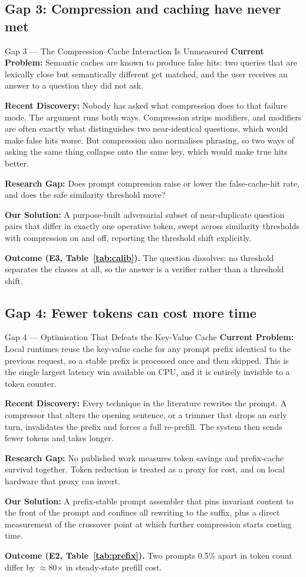\documentclass[11pt,a4paper]{article}
\newcommand{\lbl}[1]{\textcolor{accent}{\textbf{#1}}}
\begin{document}
\subsection{Gap 3: Compression and caching have never met}
\begin{gap}{Gap 3 --- The Compression--Cache Interaction Is Unmeasured}
\lbl{Current Problem:} Semantic caches are known to produce false hits: two
queries that are lexically close but semantically different get matched, and the
user receives an answer to a question they did not ask.

\lbl{Recent Discovery:} Nobody has asked what compression does to that failure
mode. The argument runs both ways. Compression strips modifiers, and modifiers
are often exactly what distinguishes two near-identical questions, which would
make false hits worse. But compression also normalises phrasing, so two ways of
asking the same thing collapse onto the same key, which would make true hits
better.

\lbl{Research Gap:} Does prompt compression raise or lower the false-cache-hit
rate, and does the safe similarity threshold move?

\lbl{Our Solution:} A purpose-built adversarial subset of near-duplicate question
pairs that differ in exactly one operative token, swept across similarity
thresholds with compression on and off, reporting the threshold shift explicitly.
\end{gap}
\noindent\textbf{Outcome (E3, Table~\ref{tab:calib}).} The question dissolves: no
threshold separates the classes at all, so the answer is a verifier rather than a
threshold shift.

\subsection{Gap 4: Fewer tokens can cost more time}
\begin{gap}{Gap 4 --- Optimisation That Defeats the Key-Value Cache}
\lbl{Current Problem:} Local runtimes reuse the key-value cache for any prompt
prefix identical to the previous request, so a stable prefix is processed once
and then skipped. This is the single largest latency win available on CPU, and it
is entirely invisible to a token counter.

\lbl{Recent Discovery:} Every technique in the literature rewrites the prompt. A
compressor that alters the opening sentence, or a trimmer that drops an early
turn, invalidates the prefix and forces a full re-prefill. The system then sends
fewer tokens and takes longer.

\lbl{Research Gap:} No published work measures token savings and prefix-cache
survival together. Token reduction is treated as a proxy for cost, and on local
hardware that proxy can invert.

\lbl{Our Solution:} A prefix-stable prompt assembler that pins invariant content
to the front of the prompt and confines all rewriting to the suffix, plus a
direct measurement of the crossover point at which further compression starts
costing time.
\end{gap}
\noindent\textbf{Outcome (E2, Table~\ref{tab:prefix}).} Two prompts 0.5\% apart
in token count differ by $\approx$80$\times$ in steady-state prefill cost.
\end{document}

